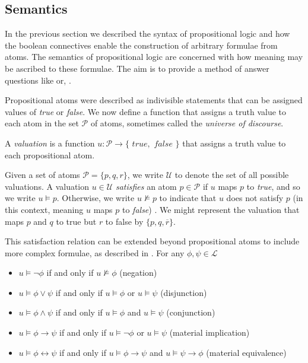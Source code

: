 \subsection{Semantics}
\label{subsection:semantics}  In the previous section we described the syntax of propositional logic
and how the boolean connectives enable the construction of arbitrary formulae from atoms. The semantics of propositional logic are concerned
with how meaning may be ascribed to these formulae. The aim is to provide a method of answer questions like 
or, .

Propositional atoms were described as indivisible statements that can be assigned values of \textit{true} or \textit{false}. We now define a
function that assigns a truth value to each atom in the set $\mathcal{P}$ of atoms, sometimes called the \textit{universe of discourse}. 

\begin{definition}
  \label{definition:valuation}  A \textit{valuation} is a function
  $u : \mathcal{P}\to \{\textit{ true}, \textit{ false }\}$ that assigns a truth value to each propositional atom.
\end{definition}

Given a set of atoms $\mathcal{P}= \{p,q,r\}$, we write $\mathcal{U}$ to denote the set of all possible valuations. A valuation $u \in \mathcal{U}$
\textit{satisfies} an atom $p \in \mathcal{P}$ if $u$ maps $p$ to \textit{true}, and so we write $u \vDash p$. Otherwise, we write
$u \nvDash p$ to indicate that $u$ does not satisfy $p$ (in this context, meaning $u$ maps $p$ to \textit{false})
\cite[p. 16]{Ben1993Mathematical}. We might represent the valuation that maps $p$ and $q$ to true but $r$ to false by $\{p,q,\overline{r}\}$.

This satisfaction relation can be extended beyond propositional atoms to include more complex formulae, as described in
. For any $\phi, \psi \in \mathcal{L}$ 

\begin{itemize}
  \item $u \vDash \neg \phi$ if and only if $u \nvDash \phi$ \hfill (negation)

  \item $u \vDash \phi \vee \psi$ if and only if $u \vDash \phi$ or $u \vDash \psi$ \hfill (disjunction)

  \item $u \vDash \phi \wedge \psi$ if and only if $u \vDash \phi$ and $u \vDash \psi$ \hfill (conjunction)

  \item $u \vDash \phi \rightarrow \psi$ if and only if $u \vDash \neg \phi$ or $u \vDash \psi$ \hfill (material implication)

  \item $u \vDash \phi \leftrightarrow \psi$ if and only if $u \vDash \phi \rightarrow \psi$ and $u \vDash \psi \rightarrow \phi$ \hfill (material
    equivalence)
\end{itemize}

